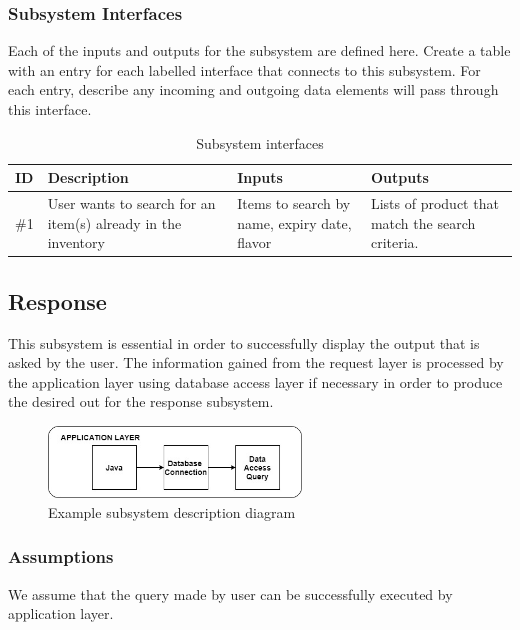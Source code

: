 \subsubsection{Subsystem Interfaces}
Each of the inputs and outputs for the subsystem are defined here. Create a table with an entry for each labelled interface that connects to this subsystem. For each entry, describe any incoming and outgoing data elements will pass through this interface.

\begin {table}[H]
\caption {Subsystem interfaces} 
\begin{center}
    \begin{tabular}{ | p{1cm} | p{6cm} | p{3cm} | p{3cm} |}
    \hline
    ID & Description & Inputs & Outputs \\ \hline
    \#1 & User wants to search for an item(s) already in the inventory & Items to search by name, expiry date, flavor & Lists of product that match the search criteria.  \\ \hline
    \end{tabular}
\end{center}
\end{table}

\subsection{Response}
This subsystem is essential in order to successfully display the output that is asked by the user. The information gained from the request layer is processed by the application layer using database access layer if necessary in order to produce the desired out for the response subsystem.

\begin{figure}[h!]
	\centering
 	\includegraphics[width=0.60\textwidth]{images/App.jpg}
 \caption{Example subsystem description diagram}
\end{figure}

\subsubsection{Assumptions}
We assume that the query made by user can be successfully executed by application layer.

